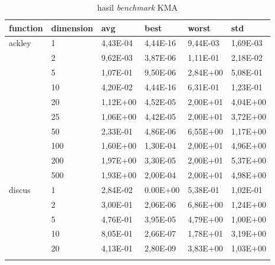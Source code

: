 \begin{longtable}[c]{|p{3.5cm}|l|l|l|l|l|}
\caption{hasil \textit{benchmark} KMA}
\label{tab:kma-result}\\
\hline
function                               & dimension & avg      & best     & worst    & std      \\ \hline
\endfirsthead
%
\endhead
%
\multirow[t]{10}{*}{ackley}               & 1         & 4,43E-04 & 4,44E-16 & 9,44E-03 & 1,69E-03 \\ \cline{2-6} 
                                       & 2         & 9,62E-03 & 3,87E-06 & 1,11E-01 & 2,18E-02 \\ \cline{2-6} 
                                       & 5         & 1,07E-01 & 9,50E-06 & 2,84E+00 & 5,08E-01 \\ \cline{2-6} 
                                       & 10        & 4,20E-02 & 4,44E-16 & 6,31E-01 & 1,23E-01 \\ \cline{2-6} 
                                       & 20        & 1,12E+00 & 4,52E-05 & 2,00E+01 & 4,04E+00 \\ \cline{2-6} 
                                       & 25        & 1,06E+00 & 4,42E-05 & 2,00E+01 & 3,72E+00 \\ \cline{2-6} 
                                       & 50        & 2,33E-01 & 4,86E-06 & 6,55E+00 & 1,17E+00 \\ \cline{2-6} 
                                       & 100       & 1,60E+00 & 1,30E-04 & 2,00E+01 & 4,96E+00 \\ \cline{2-6} 
                                       & 200       & 1,97E+00 & 3,30E-05 & 2,00E+01 & 5,37E+00 \\ \cline{2-6} 
                                       & 500       & 1,93E+00 & 2,00E-04 & 2,00E+01 & 4,98E+00 \\ \hline
\multirow[t]{10}{*}{discus}               & 1         & 2,84E-02 & 0.00E+00 & 5,38E-01 & 1,02E-01 \\ \cline{2-6} 
                                       & 2         & 3,00E-01 & 2,06E-06 & 6,86E+00 & 1,24E+00 \\ \cline{2-6} 
                                       & 5         & 4,76E-01 & 3,95E-05 & 4,79E+00 & 1,00E+00 \\ \cline{2-6} 
                                       & 10        & 8,05E-01 & 2,66E-07 & 1,78E+01 & 3,19E+00 \\ \cline{2-6} 
                                       & 20        & 4,13E-01 & 2,80E-09 & 3,83E+00 & 1,03E+00 \\ \cline{2-6} 

\end{longtable}
